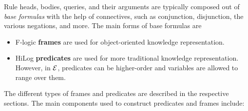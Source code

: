 \documentclass[11pt]{article}
\newcommand{\ERGO}{\mbox{\ensuremath{\cal{E}}\smaller{{\sc{RGO}}}}\xspace}
\newcommand{\FLSYSTEM}{\ERGO}
\begin{document}
Rule heads, bodies, queries, and their arguments are typically composed out
of \emph{base formulas} with the help of connectives, such as
conjunction, disjunction, the various negations, and more. The main forms
of base formulas are
\begin{itemize}
\item  F-logic \textbf{frames} are used for
  object-oriented knowledge representation.
\item  HiLog \textbf{predicates} are used for more traditional knowledge
  representation. However, in \FLSYSTEM, predicates can be higher-order and
  variables are allowed to range over them.
\end{itemize}
The different types of frames and predicates are described in the
respective sections.
The main components used to construct predicates and frames include:
\end{document}
